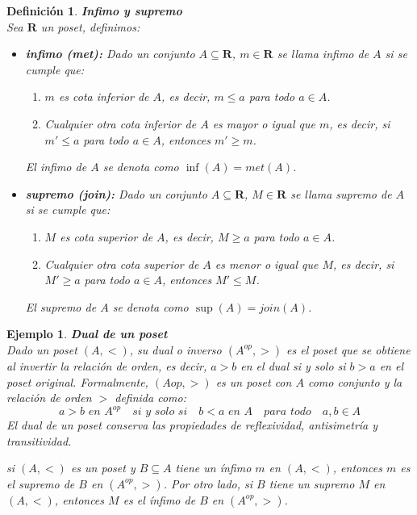 \documentclass[executivepaper]{article}
\newtheorem{defi}[propo]{Definición}
\newtheorem{ejemplo}[propo]{Ejemplo}
\begin{document}
\begin{defi}\textbf{Infimo y supremo}\\
    Sea $\mathbf{R}$ un poset, definimos:
\begin{itemize}
    \item \textbf{infimo (met):} Dado un conjunto $A \subseteq \mathbf{R}$, $m \in \mathbf{R}$ se llama infimo de $A$ si se cumple que:
    \begin{enumerate}
        \item $m$ es cota inferior de $A$, es decir, $m \leq a$ para todo $a \in A$.
        \item Cualquier otra cota inferior de $A$ es mayor o igual que $m$, es decir, si $m' \leq a$ para todo $a \in A$, entonces $m' \geq m$.
    \end{enumerate}
    El infimo de $A$ se denota como $\inf(A)=met(A)$.
    \item \textbf{supremo (join):}  Dado un conjunto $A \subseteq \mathbf{R}$, $M \in \mathbf{R}$ se llama supremo de $A$ si se cumple que:
    \begin{enumerate}
        \item $M$ es cota superior de $A$, es decir, $M \geq a$ para todo $a \in A$.
        \item Cualquier otra cota superior de $A$ es menor o igual que $M$, es decir, si $M' \geq a$ para todo $a \in A$, entonces $M' \leq M$.
    \end{enumerate}
    El supremo de $A$ se denota como $\sup(A)=join(A)$.
\end{itemize}    
\end{defi}

\begin{ejemplo}\textbf{Dual de un poset}\\
    Dado un poset $(A,<)$, su dual o inverso $(A^{op},>)$ es el poset que se obtiene al invertir la relación de orden, es decir, $a>b$ en el dual si y solo si $b>a$ en el poset original. Formalmente, $(A{op},>)$ es un poset con $A$ como conjunto y la relación de orden $>$ definida como:
    $$a > b \,\,en\,\,A^{op} \quad si\,\, y\,\, solo\,\, si \quad b < a\,\,en\,\,A \quad para\,\, todo \quad a,b \in A$$
    El dual de un poset conserva las propiedades de reflexividad, antisimetría y transitividad.

    si $(A, <)$ es un poset y $B \subseteq A$ tiene un ínfimo $m$ en $(A, <)$, entonces $m$ es el supremo de $B$ en $(A^{op}, >)$. Por otro lado, si $B$ tiene un supremo $M$ en $(A, <)$, entonces $M$ es el ínfimo de $B$ en $(A^{op}, >)$.
\end{ejemplo}
\end{document}
